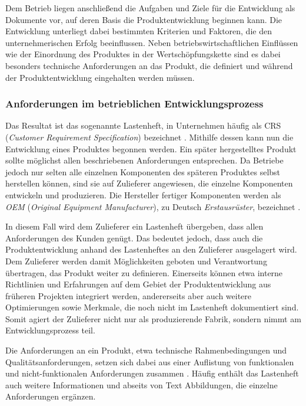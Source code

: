\documentclass[12pt]{report}
\begin{document}
Dem Betrieb liegen anschließend die Aufgaben und Ziele für die Entwicklung als Dokumente vor, auf deren Basis die Produktentwicklung beginnen kann. Die Entwicklung unterliegt dabei bestimmten Kriterien und Faktoren, die den unternehmerischen Erfolg beeinflussen. Neben betriebswirtschaftlichen Einflüssen wie der Einordnung des Produktes in der Wertschöpfungskette sind es dabei besonders technische Anforderungen an das Produkt, die definiert und während der Produktentwicklung eingehalten werden müssen.

\subsubsection{Anforderungen im betrieblichen Entwicklungsprozess}
Das Resultat ist das sogenannte Lastenheft, in Unternehmen häufig als CRS (\textit{Customer Requirement Specification}) bezeichnet \cite{dge19}. Mithilfe dessen kann nun die Entwicklung eines Produktes begonnen werden. Ein später hergestelltes Produkt sollte möglichst allen beschriebenen Anforderungen entsprechen. Da Betriebe jedoch nur selten alle einzelnen Komponenten des späteren Produktes selbst herstellen können, sind sie auf Zulieferer angewiesen, die einzelne Komponenten entwickeln und produzieren. Die Hersteller fertiger Komponenten werden als \textit{OEM} (\textit{Original Equipment Manufacturer}), zu Deutsch \textit{Erstausrüster}, bezeichnet \cite{ir09}.  

In diesem Fall wird dem Zulieferer ein Lastenheft übergeben, dass allen Anforderungen des Kunden genügt. Das bedeutet jedoch, dass auch die Produktentwicklung anhand des Lastenheftes an den Zulieferer ausgelagert wird. Dem Zulieferer werden damit Möglichkeiten geboten und Verantwortung übertragen, das Produkt weiter zu definieren. Einerseits können etwa interne Richtlinien und Erfahrungen auf dem Gebiet der Produktentwicklung aus früheren Projekten integriert werden, andererseits aber auch weitere Optimierungen sowie Merkmale, die noch nicht im Lastenheft dokumentiert sind. Somit agiert der Zulieferer nicht nur als produzierende Fabrik, sondern nimmt am Entwicklungsprozess teil.

Die Anforderungen an ein Produkt, etwa technische Rahmenbedingungen und Qualitätsanforderungen, setzen sich dabei aus einer Auflistung von funktionalen und nicht-funktionalen Anforderungen zusammen \cite{bal10}. Häufig enthält das Lastenheft auch weitere Informationen und abseits von Text Abbildungen, die einzelne Anforderungen ergänzen. 
\end{document}
